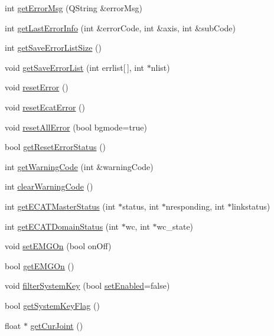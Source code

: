 \begin{DoxyCompactItemize}
int \hyperlink{classCUIApp_ab89ed3cfa8984f02170f51f064ef800b}{get\-Error\-Msg} (Q\-String \&error\-Msg)
\item 
int \hyperlink{classCUIApp_aa9b6b12846d38b038afdebb423e66d30}{get\-Last\-Error\-Info} (int \&error\-Code, int \&axis, int \&sub\-Code)
\item 
int \hyperlink{classCUIApp_a843c50491f63fba830c9d321b4af811b}{get\-Save\-Error\-List\-Size} ()
\item 
void \hyperlink{classCUIApp_abf330221079f242d37032e212d0cf401}{get\-Save\-Error\-List} (int errlist\mbox{[}$\,$\mbox{]}, int $\ast$nlist)
\item 
void \hyperlink{classCUIApp_a7e636d2d36cc25795e286cdc9b20b292}{reset\-Error} ()
\item 
void \hyperlink{classCUIApp_a49cb79bd21645b2247a7246c23178940}{reset\-Ecat\-Error} ()
\item 
void \hyperlink{classCUIApp_a4d7b7d79f9058f4788436b618c5d3f8c}{reset\-All\-Error} (bool bgmode=true)
\item 
bool \hyperlink{classCUIApp_a71f52cfd98a3b974e6e5bb18792022fa}{get\-Reset\-Error\-Status} ()
\item 
int \hyperlink{classCUIApp_af62220023edaab281f7ad32df8c7149d}{get\-Warning\-Code} (int \&warning\-Code)
\item 
int \hyperlink{classCUIApp_a65fd5f0b44938f9fd50b7ffa95beb2f3}{clear\-Warning\-Code} ()
\item 
int \hyperlink{classCUIApp_abb8769af70015d3d55aa180df9783c9b}{get\-E\-C\-A\-T\-Master\-Status} (int $\ast$status, int $\ast$nresponding, int $\ast$linkstatus)
\item 
int \hyperlink{classCUIApp_a80553db100390f6a3cba662ba79f0011}{get\-E\-C\-A\-T\-Domain\-Status} (int $\ast$wc, int $\ast$wc\-\_\-state)
\item 
void \hyperlink{classCUIApp_a16723ff044ecfcc4eac46f1190490261}{set\-E\-M\-G\-On} (bool on\-Off)
\item 
bool \hyperlink{classCUIApp_a37ba11617d17bd7876e678ad1a23080f}{get\-E\-M\-G\-On} ()
\item 
void \hyperlink{classCUIApp_ab08c13cf86c8600d6355a4b82d0d44cc}{filter\-System\-Key} (bool \hyperlink{classCUIApp_a0bb9aaecc950f991d3ecc69e5895e9e6}{set\-Enabled}=false)
\item 
bool \hyperlink{classCUIApp_a3929465084f3838bdcb958fffb3d6ee3}{get\-System\-Key\-Flag} ()
\item 
float $\ast$ \hyperlink{classCUIApp_a3044e8082b57b131955349a9e59d1341}{get\-Cur\-Joint} ()
\item 

\end{DoxyCompactItemize}
